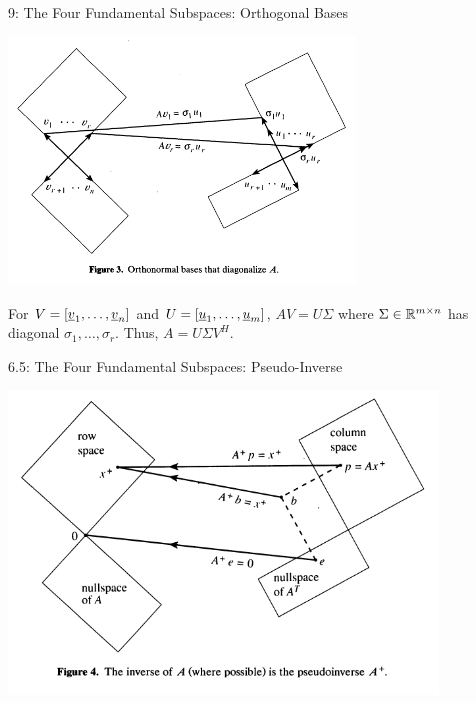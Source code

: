 \documentclass[10pt,english,aspectratio=169]{beamer}
\begin{document}
\begin{frame}{9: The Four Fundamental Subspaces: Orthogonal Bases}

\vspace{-1mm}
\hspace*{-1mm}
\includegraphics[width=92mm]{figures/strang_fig3}

\vspace{-3mm}
For $V = [\underline{v}_1,\ldots,\underline{v}_n]
$ and $U = [\underline{u}_1,\ldots,\underline{u}_m]$, $A V = U \Sigma$ where $\Sigma \in \mathbb{R}^{m \times n}$ has diagonal $\sigma_1,\ldots,\sigma_r$.  Thus, $A = U \Sigma V^H$.


\let\thefootnote\relax\footnotetext{\hspace*{-4mm} {\tiny Figure from ``The Fundamental Theorem of Linear Algebra'' by Gilbert Strang, The American Mathematical Monthly, Nov. 1993 }}

\end{frame}




\begin{frame}{6.5: The Four Fundamental Subspaces: Pseudo-Inverse}

\hspace*{-4mm}
\includegraphics[width=114mm]{figures/strang_fig4}

\let\thefootnote\relax\footnotetext{\hspace*{-4mm} {\tiny Figure from ``The Fundamental Theorem of Linear Algebra'' by Gilbert Strang, The American Mathematical Monthly, Nov. 1993 }}

\end{frame}
\end{document}

